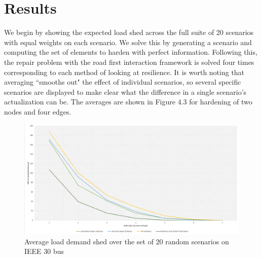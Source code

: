 \section{Results}

We begin by showing the expected load shed across the full suite of 20 scenarios with equal weights on each scenario. We solve this by generating a scenario and computing the set of elements to harden with perfect information. Following this, the repair problem with the road first interaction framework is solved four times corresponding to each method of looking at resilience.  It is worth noting that averaging ``smooths out" the effect of individual scenarios, so several specific scenarios are displayed to make clear what the difference in a single scenario's actualization can be. The averages are shown in Figure 4.3 for hardening of two nodes and four edges.	
\begin{figure}[htbp]
	\centering
	\includegraphics[width=.9\linewidth]{AverageSpaghetti.png}
	\caption{Average load demand shed over the set of 20 random scenarios on IEEE  30 bus}
\end{figure}

\begin{table}[htbp]
	\centering
		\caption{Expected unsatisfied demand by shift in each hardening method}

	\label{time}
\end{table}


